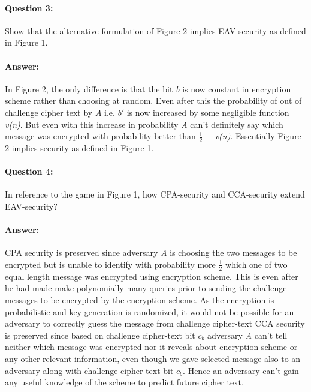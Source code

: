 \documentclass{article}
\begin{document}
    \paragraph{Question 3:} Show that the alternative formulation of Figure 2 implies EAV-security as defined in Figure 1.
    \paragraph{Answer: \newline}
        In Figure 2, the only difference is that the bit \emph{b} is now constant in encryption scheme rather than choosing at random. 
        Even after this the probability of out of challenge cipher text by $\mathit{A}$ i.e. $b\prime$ is now increased by some negligible function \emph{v(n)}. But even with this increase in probability \emph{A} can't definitely say which message was encrypted with probability better than $\frac{1}{2}$ + \emph{v(n)}. Essentially Figure 2 implies security as defined in Figure 1.
    
    \paragraph{Question 4:} In reference to the game in Figure 1, how CPA-security and CCA-security extend EAV-security?
    \paragraph{Answer: \newline}
        CPA security is preserved since adversary \emph{A} is choosing the two messages to be encrypted but is unable to identify with probability more $\frac{1}{2}$ which one of two equal length message was encrypted using encryption scheme. This is even after he had made make polynomially many queries prior to sending the challenge messages to be encrypted by the encryption scheme. As the encryption is probabilistic and key generation is randomized, it would not be possible for an adversary to correctly guess the message from challenge cipher-text \newline \newline
        CCA security is preserved since based on challenge cipher-text bit $c_b$ adversary \emph{A} can't tell neither which message was encrypted nor it reveals about encryption scheme or any other relevant information, even though we gave selected message also to an adversary along with challenge cipher text bit $c_b$. Hence an adversary can't gain any useful knowledge of the scheme to predict future cipher text.
\end{document}
